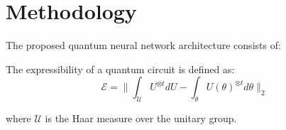 ﻿\section{Methodology}
The proposed quantum neural network architecture consists of:

The expressibility of a quantum circuit is defined as:
\[
\mathcal{E} = \| \int_{\mathcal{U}} U^{\otimes t} dU - \int_{\theta} U(\theta)^{\otimes t} d\theta \|_2
\]

where $$ is the Haar measure over the unitary group.
